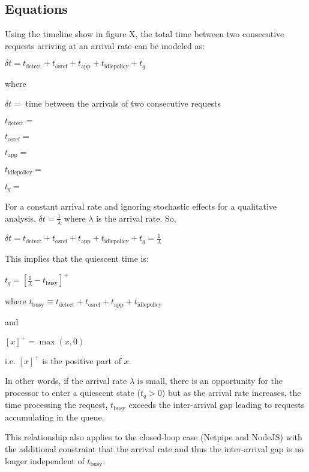\label{sec:model}


\subsection{Equations}

Using the timeline show in figure X, the total time between two consecutive requests arriving at an arrival rate can be modeled as:

$\delta t = t_{\text{detect}} + t_{\text{osref}} + t_{\text{app}} + t_{\text{idlepolicy}} + t_q$

where 

$\delta t = $ time between the arrivals of two consecutive requests

$t_{\text{detect}} = $

$t_{\text{osref}} = $

$t_{\text{app}} = $

$t_{\text{idlepolicy}} = $

$t_q = $

For a constant arrival rate and ignoring stochastic effects for a qualitative analysis, $\delta t = \frac{1}{\lambda}$ where $\lambda$ is the arrival rate. So,

$\delta t = t_{\text{detect}} + t_{\text{osref}} + t_{\text{app}} + t_{\text{idlepolicy}} + t_q = \frac{1}{\lambda}$

This implies that the quiescent time is:

$t_q = \left[\frac{1}{\lambda} - t_\text{busy}\right]^+$

where $t_{\text{busy}} \equiv t_{\text{detect}} + t_{\text{osref}} + t_{\text{app}} + t_{\text{idlepolicy}}$

and 

$[x]^+ = \max(x,0)$

i.e. $[x]^+$ is the positive part of $x$.

In other words, if the arrival rate $\lambda$ is small, there is an opportunity for the processor to enter a quiescent state ($t_q > 0$) but as the arrival rate increases, the time processing the request, $t_\text{busy}$ exceeds the inter-arrival gap leading to requests accumulating in the queue. 

This relationship also applies to the closed-loop case (Netpipe and NodeJS) with the additional constraint that the arrival rate and thus the inter-arrival gap is no longer independent of $t_\text{busy}$.


